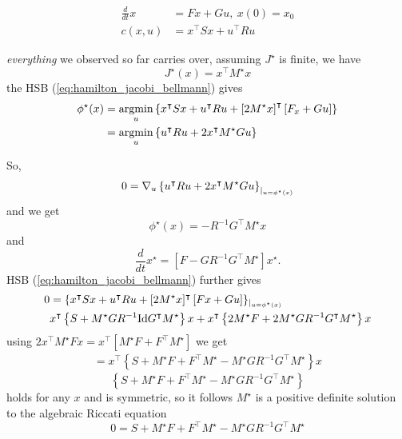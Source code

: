 \begin{align*}
    \frac{d}{dt}x&=Fx+Gu,\ x(0)=x_0\\
    c(x,u)&=x^\intercal S x + u^\intercal R u 
\end{align*}

\textit{everything} we observed so far carries over, assuming \(J^\star\) is finite, we 
have 
\[J^\star(x)=x^\intercal M^\star x\]
the HSB (\ref{eq:hamilton_jacobi_bellmann}) gives 
\begin{align*}
    \phi^\star(x)&=\operatorname*{\text{argmin}}_u \left\{x^\intercal S x+ u^\intercal R u+ \left[2 M^\star x\right]^\intercal \left[F_x+ Gu\right] \right\}\\
    &=\operatorname*{\text{argmin}}_u \left\{u^\intercal R u+2 x^\intercal M^\star Gu \right\}
\end{align*}

So, 
\begin{align*}
    0=\nabla_u\left\{u^\intercal R u+2 x^\intercal M^\star Gu \right\}_{|_{u=\phi^\star(x)}}
\end{align*}
and we get 
\[\phi^\star(x)=-R^{-1}G^\intercal M^\star x\]
and 
\[\frac{d}{dt}x^\star=\left[F-GR^{-1}G^\intercal M^\star\right]x^\star.\]
HSB (\ref{eq:hamilton_jacobi_bellmann}) further gives 
\begin{align*}
    0&=\{x^\intercal S x+ u^\intercal R u+[2M^\star x]^\intercal \left[Fx+Gu\right]\}_{|_{u=\phi^\star(x)}}\\
    &x^\intercal \left\{S+M^\star GR^{-1}\text{Id} G^\intercal M^\star \right\}x+x^\intercal\left\{2M^\star F+2M^\star G R^{-1}G^\intercal M^\star \right\}x
\end{align*}
using \(2x^\intercal M^\star Fx=x^\intercal \left[M^\star F + F^\intercal M^\star\right]\)
we get 
\begin{align*}
    =x^\intercal \left\{S+M^\star F+ F^\intercal M^\star-M^\star GR^{-1}G^\intercal M^\star\right\}x %
\end{align*}
\[\left\{S+M^\star F+ F^\intercal M^\star-M^\star GR^{-1}G^\intercal M^\star\right\}\]
holds for any \(x\) and is symmetric, so it follows \(M^\star\) is a positive definite solution to the 
algebraic Riccati equation 
\[0=S+M^\star F+ F^\intercal M^\star- M^\star GR^{-1}G^\intercal M^\star\]
